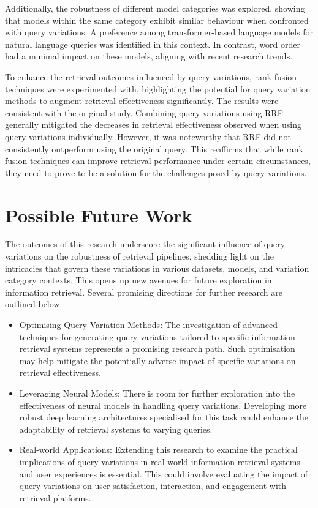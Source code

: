 Additionally, the robustness of different model categories was explored, showing that models within the same category exhibit similar behaviour when confronted with query variations. A preference among transformer-based language models for natural language queries was identified in this context. In contrast, word order had a minimal impact on these models, aligning with recent research trends.

To enhance the retrieval outcomes influenced by query variations, rank fusion techniques were experimented with, highlighting the potential for query variation methods to augment retrieval effectiveness significantly. The results were consistent with the original study. Combining query variations using RRF generally mitigated the decreases in retrieval effectiveness observed when using query variations individually. However, it was noteworthy that RRF did not consistently outperform using the original query. This reaffirms that while rank fusion techniques can improve retrieval performance under certain circumstances, they need to prove to be a solution for the challenges posed by query variations.

\section{Possible Future Work}
The outcomes of this research underscore the significant influence of query variations on the robustness of retrieval pipelines, shedding light on the intricacies that govern these variations in various datasets, models, and variation category contexts. This opens up new avenues for future exploration in information retrieval. Several promising directions for further research are outlined below:

\begin{itemize}
    \item Optimising Query Variation Methods: The investigation of advanced techniques for generating query variations tailored to specific information retrieval systems represents a promising research path. Such optimisation may help mitigate the potentially adverse impact of specific variations on retrieval effectiveness.
    \item Leveraging Neural Models: There is room for further exploration into the effectiveness of neural models in handling query variations. Developing more robust deep learning architectures specialised for this task could enhance the adaptability of retrieval systems to varying queries.
    \item Real-world Applications: Extending this research to examine the practical implications of query variations in real-world information retrieval systems and user experiences is essential. This could involve evaluating the impact of query variations on user satisfaction, interaction, and engagement with retrieval platforms.
\end{itemize}

